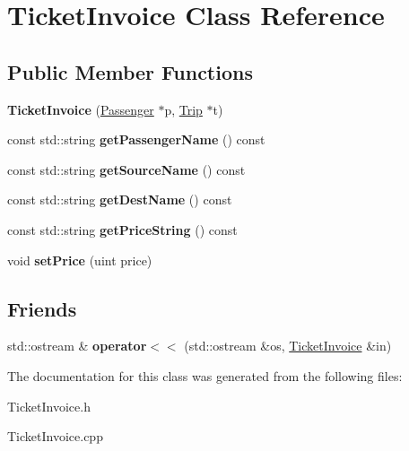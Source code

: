 \hypertarget{classTicketInvoice}{}\section{Ticket\+Invoice Class Reference}
\label{classTicketInvoice}
\subsection*{Public Member Functions}
\begin{DoxyCompactItemize}
\item 
\mbox{\label{classTicketInvoice_a38b37e5168ce71bbf37aceef8a6f6267}} 
{\bfseries Ticket\+Invoice} (\mbox{\hyperlink{classPassenger}{Passenger}} $\ast$p, \mbox{\hyperlink{classTrip}{Trip}} $\ast$t)
\item 
\mbox{\label{classTicketInvoice_a9fdfdcd08ff90480ca85e027f57033e4}} 
const std\+::string {\bfseries get\+Passenger\+Name} () const
\item 
\mbox{\label{classTicketInvoice_ad692197170d5cb11790dff71150ef891}} 
const std\+::string {\bfseries get\+Source\+Name} () const
\item 
\mbox{\label{classTicketInvoice_a1db4ffac81e11b765c6204278a3df8ff}} 
const std\+::string {\bfseries get\+Dest\+Name} () const
\item 
\mbox{\label{classTicketInvoice_a97998091765f01ff9f394210530a89ed}} 
const std\+::string {\bfseries get\+Price\+String} () const
\item 
\mbox{\label{classTicketInvoice_afeed9962f0276861876a001e372d2063}} 
void {\bfseries set\+Price} (uint price)
\end{DoxyCompactItemize}
\subsection*{Friends}
\begin{DoxyCompactItemize}
\item 
\mbox{\label{classTicketInvoice_ae78ba81ba79ed7e8c9e8cd23a910f00d}} 
std\+::ostream \& {\bfseries operator$<$$<$} (std\+::ostream \&os, \mbox{\hyperlink{classTicketInvoice}{Ticket\+Invoice}} \&in)
\end{DoxyCompactItemize}


The documentation for this class was generated from the following files\+:\begin{DoxyCompactItemize}
\item 
Ticket\+Invoice.\+h\item 
Ticket\+Invoice.\+cpp\end{DoxyCompactItemize}
